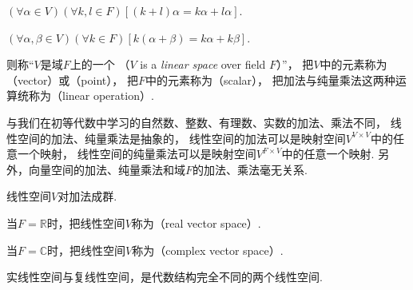 \begin{definition}
\begin{center}
\begin{minipage}{.8\textwidth}
\begin{axiom}
		\((\forall\alpha\in V)
		(\forall k,l\in F)
		[(k+l)\alpha=k\alpha+l\alpha]\).
		\end{axiom}
		\begin{axiom}\label{definition:线性空间.运算法则8}
		\((\forall\alpha,\beta\in V)
		(\forall k\in F)
		[k(\alpha+\beta)=k\alpha+k\beta]\).
		\end{axiom}
	\end{minipage}
\end{center}
则称“\(V\)是域\(F\)上的一个%
（\(V\) is a \emph{linear space} over field \(F\)）”，
把\(V\)中的元素称为（vector）或（point），
把\(F\)中的元素称为（scalar），
把加法与纯量乘法这两种运算统称为（linear operation）.
\end{definition}
\begin{remark}
与我们在初等代数中学习的自然数、整数、有理数、实数的加法、乘法不同，
线性空间的加法、纯量乘法是抽象的，
线性空间的加法可以是映射空间\(V^{V \times V}\)中的任意一个映射，
线性空间的纯量乘法可以是映射空间\(V^{F \times V}\)中的任意一个映射.
另外，向量空间的加法、纯量乘法和域\(F\)的加法、乘法毫无关系.
\end{remark}
\begin{remark}
线性空间\(V\)对加法成群.
\end{remark}

当\(F = \mathbb{R}\)时，把线性空间\(V\)称为（real vector space）.

当\(F = \mathbb{C}\)时，把线性空间\(V\)称为（complex vector space）.

实线性空间与复线性空间，是代数结构完全不同的两个线性空间.

